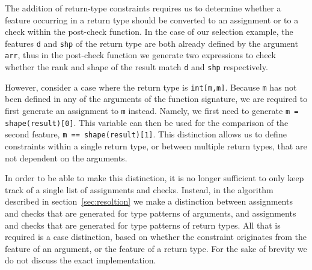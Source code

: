 \noindent
The addition of return-type constraints requires us to determine whether a feature occurring in a return type should be converted to an assignment or to a check within the post-check function.
In the case of our selection example, the features \texttt{d} and \texttt{shp} of the return type are both already defined by the argument \texttt{arr}, thus in the post-check function we generate two expressions to check whether the rank and shape of the result match \texttt{d} and \texttt{shp} respectively.

However, consider a case where the return type is \texttt{int[m,m]}.
Because \texttt{m} has not been defined in any of the arguments of the function signature, we are required to first generate an assignment to \texttt{m} instead.
Namely, we first need to generate \texttt{m = shape(result)[0]}.
This variable can then be used for the comparison of the second feature, \texttt{m == shape(result)[1]}.
This distinction allows us to define constraints within a single return type, or between multiple return types, that are not dependent on the arguments.

In order to be able to make this distinction, it is no longer sufficient to only keep track of a single list of assignments and checks.
Instead, in the algorithm described in section~\ref{sec:resoltion} we make a distinction between assignments and checks that are generated for type patterns of arguments, and assignments and checks that are generated for type patterns of return types.
All that is required is a case distinction, based on whether the constraint originates from the feature of an argument, or the feature of a return type.
For the sake of brevity we do not discuss the exact implementation.

